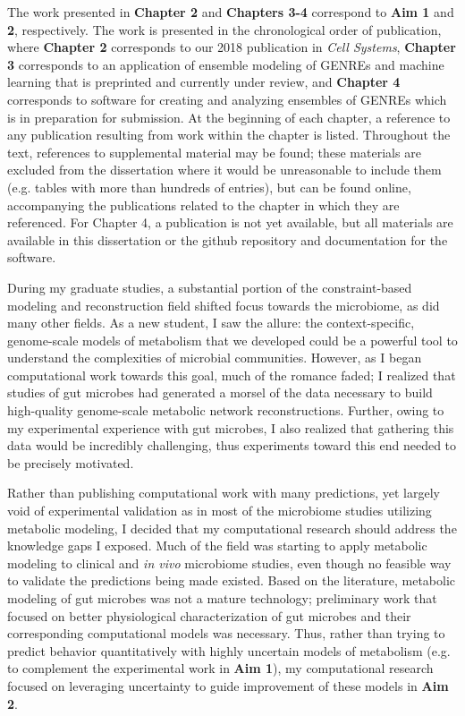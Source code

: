 \documentclass[11pt,twocolumn,notitlepage,openany,twoside]{book}
\begin{document}
\begin{refsection}
The work presented in \textbf{Chapter 2} and \textbf{Chapters 3-4} correspond to \textbf{Aim 1} and \textbf{2}, respectively. The work is presented in the chronological order of publication, where \textbf{Chapter 2} corresponds to our 2018 publication in \textit{Cell Systems}, \textbf{Chapter 3} corresponds to an application of ensemble modeling of GENREs and machine learning that is preprinted and currently under review, and \textbf{Chapter 4} corresponds to software for creating and analyzing ensembles of GENREs which is in preparation for submission. At the beginning of each chapter, a reference to any publication resulting from work within the chapter is listed. Throughout the text, references to supplemental material may be found; these materials are excluded from the dissertation where it would be unreasonable to include them (e.g. tables with more than hundreds of entries), but can be found online, accompanying the publications related to the chapter in which they are referenced. For Chapter 4, a publication is not yet available, but all materials are available in this dissertation or the github repository and documentation for the software.

During my graduate studies, a substantial portion of the constraint-based modeling and reconstruction field shifted focus towards the microbiome, as did many other fields. As a new student, I saw the allure: the context-specific, genome-scale models of metabolism that we developed could be a powerful tool to understand the complexities of microbial communities. However, as I began computational work towards this goal, much of the romance faded; I realized that studies of gut microbes had generated a morsel of the data necessary to build high-quality genome-scale metabolic network reconstructions. Further, owing to my experimental experience with gut microbes, I also realized that gathering this data would be incredibly challenging, thus experiments toward this end needed to be precisely motivated.

Rather than publishing computational work with many predictions, yet largely void of experimental validation as in most of the microbiome studies utilizing metabolic modeling, I decided that my computational research should address the knowledge gaps I exposed. Much of the field was starting to apply metabolic modeling to clinical and \textit{in vivo} microbiome studies, even though no feasible way to validate the predictions being made existed. Based on the literature, metabolic modeling of gut microbes was not a mature technology; preliminary work that focused on better physiological characterization of gut microbes and their corresponding computational models was necessary. Thus, rather than trying to predict behavior quantitatively with highly uncertain models of metabolism (e.g. to complement the experimental work in \textbf{Aim 1}), my computational research focused on leveraging uncertainty to guide improvement of these models in \textbf{Aim 2}.


\end{refsection}
\end{document}
